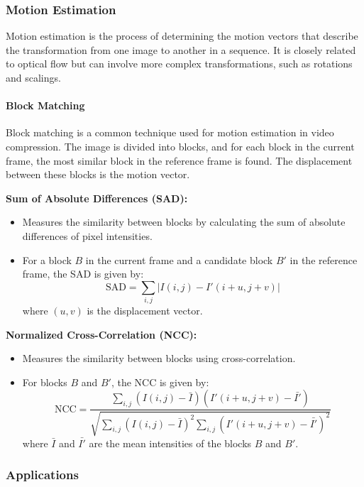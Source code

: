 \documentclass[12pt]{article}
\begin{document}
\subsubsection{Motion Estimation}

Motion estimation is the process of determining the motion vectors that describe the transformation from one image to another in a sequence. It is closely related to optical flow but can involve more complex transformations, such as rotations and scalings.

\paragraph{Block Matching}

Block matching is a common technique used for motion estimation in video compression. The image is divided into blocks, and for each block in the current frame, the most similar block in the reference frame is found. The displacement between these blocks is the motion vector.

\textbf{Sum of Absolute Differences (SAD):}
\begin{itemize}
    \item Measures the similarity between blocks by calculating the sum of absolute differences of pixel intensities.
    \item For a block \( B \) in the current frame and a candidate block \( B' \) in the reference frame, the SAD is given by:
    \[
    \text{SAD} = \sum_{i, j} |I(i, j) - I'(i + u, j + v)|
    \]
    where \( (u, v) \) is the displacement vector.
\end{itemize}

\textbf{Normalized Cross-Correlation (NCC):}
\begin{itemize}
    \item Measures the similarity between blocks using cross-correlation.
    \item For blocks \( B \) and \( B' \), the NCC is given by:
    \[
    \text{NCC} = \frac{\sum_{i, j} (I(i, j) - \bar{I})(I'(i + u, j + v) - \bar{I'})}{\sqrt{\sum_{i, j} (I(i, j) - \bar{I})^2 \sum_{i, j} (I'(i + u, j + v) - \bar{I'})^2}}
    \]
    where \( \bar{I} \) and \( \bar{I'} \) are the mean intensities of the blocks \( B \) and \( B' \).
\end{itemize}

\subsubsection{Applications}
\end{document}
